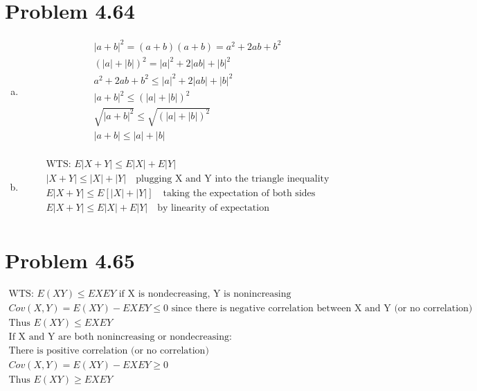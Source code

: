 \documentclass{article}
\begin{document}
\begin{flushleft}
\section*{Problem 4.64}
\begin{enumerate}[(a)]
\item
\begin{multline*}
|a+b|^2=(a+b)(a+b)=a^2+2ab+b^2\\
(|a|+|b|)^2= |a|^2+2|ab|+|b|^2\\
a^2+2ab+b^2\leq |a|^2+2|ab|+|b|^2\\
|a+b|^2\leq (|a|+|b|)^2\\
\sqrt{|a+b|^2}\leq \sqrt{(|a|+|b|)^2}\\
|a+b|\leq |a|+|b|\\
\end{multline*}
\item 
\begin{multline*}
\text{WTS: } E|X+Y|\leq E|X|+E|Y|\\
|X+Y|\leq |X|+|Y| \quad \text{plugging X and Y into the triangle inequality}\\
E|X+Y|\leq E[|X|+|Y|] \quad \text{taking the expectation of both sides}\\
E|X+Y|\leq E|X|+E|Y| \quad \text{by linearity of expectation}\\
\end{multline*}
\end{enumerate}
\section*{Problem 4.65}
\begin{multline*}
\text{WTS: } E(XY)\leq EXEY \text{ if X is nondecreasing, Y is nonincreasing}\\
Cov(X,Y)=E(XY)-EXEY\leq 0 \text{ since there is negative correlation between X and Y (or no correlation)}\\
\text{Thus } E(XY)\leq EXEY\\
\text{If X and Y are both nonincreasing or nondecreasing}:\\
\text{There is positive correlation (or no correlation)}\\
Cov(X,Y)=E(XY)-EXEY\geq 0\\
\text{Thus } E(XY)\geq EXEY\\
\end{multline*}

\end{flushleft}
\end{document}
